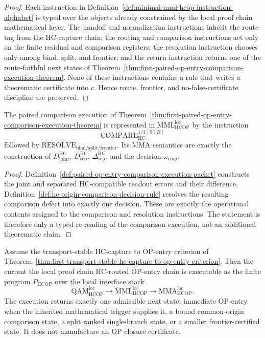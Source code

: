 \begin{proof}
Each instruction in Definition~\ref{def:minimal-mml-hcop-instruction-alphabet} is typed over the objects already constrained by the local proof chain mathematical layer. The handoff and normalization instructions inherit the route tag from the HC-capture chain; the routing and comparison instructions act only on the finite residual and comparison registers; the resolution instruction chooses only among \(\mathrm{bind}\), \(\mathrm{split}\), and \(\mathrm{frontier}\); and the return instruction returns one of the route-faithful next states of Theorem~\ref{thm:first-paired-op-entry-comparison-execution-theorem}. None of these instructions contains a rule that writes a theorematic certificate into \(c\). Hence route, frontier, and no-false-certificate discipline are preserved.
\end{proof}

\begin{proposition}
\label{prop:r04-comparison-as-one-admissible-mml-mma-step}
The paired comparison execution of Theorem~\ref{thm:first-paired-op-entry-comparison-execution-theorem} is represented in \(\mathrm{MML}_{\mathrm{HCOP}}^{\mathrm{loc}}\) by the instruction
\[
 \mathrm{COMPARE}_{\mathrm{HC}}^{1/4\mid 5(B)}
\]
followed by \(\mathrm{RESOLVE}_{\mathrm{bind/split/frontier}}\). Its MMA semantics are exactly the construction of \(D_{\mathrm{joint}}^{\mathrm{HC}}\), \(D_{\mathrm{sep}}^{\mathrm{HC}}\), \(\Delta_{\mathrm{sep}}^{\mathrm{HC}}\), and the decision \(\omega_{\mathrm{cmp}}\).
\end{proposition}

\begin{proof}
Definition~\ref{def:paired-op-entry-comparison-execution-packet} constructs the joint and separated HC-compatible readout errors and their difference. Definition~\ref{def:hc-origin-comparison-decision-rule} resolves the resulting comparison defect into exactly one decision. These are exactly the operational contents assigned to the comparison and resolution instructions. The statement is therefore only a typed re-reading of the comparison execution, not an additional theorematic claim.
\end{proof}

\begin{theorem}
\label{thm:hc-routed-op-entry-as-finite-mml-mma-program}
Assume the transport-stable HC-capture to OP-entry criterion of Theorem~\ref{thm:first-transport-stable-hc-capture-to-op-entry-criterion}. Then the current the local proof chain HC-routed OP-entry chain is executable as the finite program \(P_{\mathrm{HCOP}}\) over the local interface stack
\[
 \mathrm{QAM}_{\mathrm{HCOP}}^{\mathrm{loc}}
 \longrightarrow
 \mathrm{MML}_{\mathrm{HCOP}}^{\mathrm{loc}}
 \longrightarrow
 \mathrm{MMA}_{\mathrm{HCOP}}^{\mathrm{loc}}.
\]
The execution returns exactly one admissible next state: immediate OP-entry when the inherited mathematical trigger supplies it, a bound common-origin comparison state, a split ranked single-branch state, or a smaller frontier-certified state. It does not manufacture an OP closure certificate.
\end{theorem}

